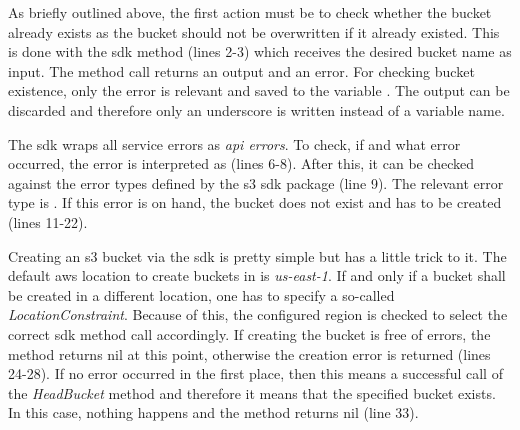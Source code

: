 As briefly outlined above, the first action must be to check whether the bucket already exists as the bucket should not be overwritten if it already existed.
This is done with the \ac{sdk} method  (lines 2-3) which receives the desired bucket name as input.
The method call returns an output and an error.
For checking bucket existence, only the error is relevant and saved to the variable .
The output can be discarded and therefore only an underscore is written instead of a variable name.

The \ac{sdk} wraps all service errors as \emph{\ac{api} errors}.
To check, if and what error occurred, the error is interpreted as  (lines 6-8).
After this, it can be checked against the error types defined by the \ac{s3} \ac{sdk} package (line 9).
The relevant error type is .
If this error is on hand, the bucket does not exist and has to be created (lines 11-22).

Creating an \ac{s3} bucket via the \ac{sdk} is pretty simple but has a little trick to it.
The default \ac{aws} location to create buckets in is \emph{us-east-1}.
If and only if a bucket shall be created in a different location, one has to specify a so-called \emph{LocationConstraint}.
Because of this, the configured region is checked to select the correct \ac{sdk} method call accordingly.
If creating the bucket is free of errors, the method returns nil at this point, otherwise the creation error is returned (lines 24-28).
If no error occurred in the first place, then this means a successful call of the \emph{HeadBucket} method and therefore it means that the specified bucket exists.
In this case, nothing happens and the method returns nil (line 33).



